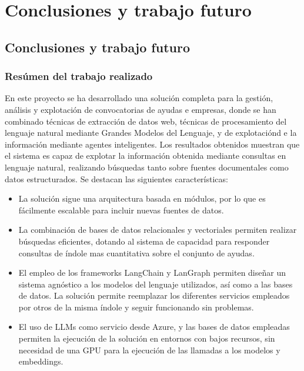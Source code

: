 \chapter{Conclusiones y trabajo futuro}
\label{chapter:Conclusiones y trabajo futuro}



\section{Conclusiones y trabajo futuro}


\subsection{Resúmen del trabajo realizado}

En este proyecto se ha desarrollado una solución completa para la gestión, análisis y explotación de convocatorias de ayudas e empresas, donde se han combinado técnicas de extracción de datos web, técnicas de procesamiento del lenguaje natural mediante Grandes Modelos del Lenguaje, y de explotaciónd e la información mediante agentes inteligentes.
Los resultados obtenidos muestran que el sistema es capaz de explotar la información obtenida mediante consultas en lenguaje natural, realizando búsquedas tanto sobre fuentes documentales como datos estructurados.
Se destacan las siguientes características:

\begin{itemize}
    \item La solución sigue una arquitectura basada en módulos, por lo que es fácilmente escalable para incluir nuevas fuentes de datos.
    \item La combinación de bases de datos relacionales y vectoriales permiten realizar búsquedas eficientes, dotando al sistema de capacidad para responder consultas de índole mas cuantitativa sobre el conjunto de ayudas.
    \item El empleo de los frameworks LangChain y LanGraph permiten diseñar un sistema agnóstico a los modelos del lenguaje utilizados, así como a las bases de datos. La solución permite reemplazar los diferentes servicios empleados por otros de la misma índole y seguir funcionando sin problemas.
    \item El uso de LLMs como servicio desde Azure, y las bases de datos empleadas permiten la ejecución de la solución en entornos con bajos recursos, sin necesidad de una GPU para la ejecución de las llamadas a los modelos y embeddings.
\end{itemize}

